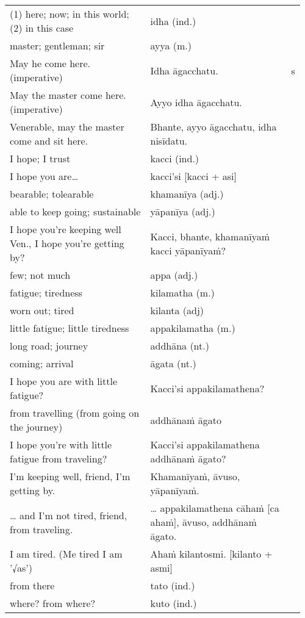 \documentclass[a5paper]{memoir}
\begin{document}
\begin{longtable}{L{0.48\linewidth} L{0.48\linewidth} H}
(1) here; now; in this world; (2) in this case & idha (ind.) & \\[0pt]
master; gentleman; sir & ayya (m.) & \\[0pt]
May he come here. (imperative) & Idha āgacchatu. & s\\[0pt]
May the master come here. (imperative) & Ayyo idha āgacchatu. & \\[0pt]
Venerable, may the master come and sit here. & Bhante, ayyo āgacchatu, idha nisīdatu. & \\[0pt]
I hope; I trust & kacci (ind.) & \\[0pt]
I hope you are\ldots{} & kacci'si [kacci + asi] & \\[0pt]
bearable; tolearable & khamanīya (adj.) & \\[0pt]
able to keep going; sustainable & yāpanīya (adj.) & \\[0pt]
I hope you're keeping well Ven., I hope you're getting by? & Kacci, bhante, khamanīyaṁ kacci yāpanīyaṁ? & \\[0pt]
few; not much & appa (adj.) & \\[0pt]
fatigue; tiredness & kilamatha (m.) & \\[0pt]
worn out; tired & kilanta (adj) & \\[0pt]
little fatigue; little tiredness & appakilamatha (m.) & \\[0pt]
long road; journey & addhāna (nt.) & \\[0pt]
coming; arrival & āgata (nt.) & \\[0pt]
I hope you are with little fatigue? & Kacci'si appakilamathena? & \\[0pt]
from travelling (from going on the journey) & addhānaṁ āgato & \\[0pt]
I hope you're with little fatigue from traveling? & Kacci'si appakilamathena addhānaṁ āgato? & \\[0pt]
I'm keeping well, friend, I'm getting by. & Khamanīyaṁ, āvuso, yāpanīyaṁ. & \\[0pt]
\ldots{} and I'm not tired, friend, from traveling. & \ldots{} appakilamathena cāhaṁ [ca ahaṁ], āvuso, addhānaṁ āgato. & \\[0pt]
I am tired. (Me tired I am '√as') & Ahaṁ kilantosmi. [kilanto + asmi] & \\[0pt]
from there & tato (ind.) & \\[0pt]
where? from where? & kuto (ind.) & \\[0pt]

\end{longtable}
\end{document}
